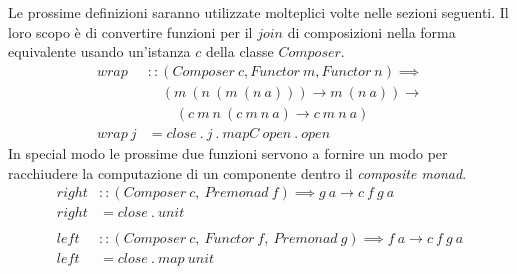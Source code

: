 Le prossime definizioni saranno utilizzate molteplici volte nelle sezioni
seguenti.
Il loro scopo è di convertire funzioni per il $join$ di composizioni nella forma
equivalente usando un'istanza $c$ della classe $Composer$.
\begin{align*}
  wrap &:: (Composer\ c, Functor\ m, Functor\ n) \implies\\
       &\quad (m\ (n\ (m\ (n\ a))) \to m\ (n\ a)) \to\\
       &\qquad (c\ m\ n\ (c\ m\ n\ a) \to c\ m\ n\ a)\\
  wrap\ j &= close\ .\ j\ .\ mapC\ open\ .\ open
\end{align*}
In special modo le prossime due funzioni servono a fornire un modo per racchiudere
la computazione di un componente dentro il \textit{composite monad}.
\label{left_and_right}
\begin{align*}
  right &:: (Composer\ c,\ Premonad\ f) \implies g\ a \to c\ f\ g\ a\\
  right &= close\ .\ unit\\\\
  left &:: (Composer\ c,\ Functor\ f,\ Premonad\ g) \implies f\ a \to c\ f\ g\ a\\
  left &= close\ .\ map\ unit
\end{align*}

